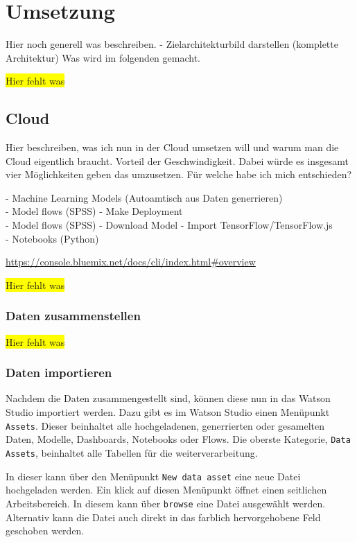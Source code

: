 \section{Umsetzung}
Hier noch generell was beschreiben. - Zielarchitekturbild darstellen (komplette Architektur)
Was wird im folgenden gemacht.

\colorbox{yellow}{Hier fehlt was}

\subsection{Cloud}
Hier beschreiben, was ich nun in der Cloud umsetzen will und warum man die Cloud eigentlich braucht. Vorteil der
Geschwindigkeit. Dabei würde es insgesamt vier Möglichkeiten geben das umzusetzen. Für welche habe ich mich
entschieden?

- Machine Learning Models (Autoamtisch aus Daten generrieren)\\
- Model flows (SPSS) - Make Deployment\\
- Model flows (SPSS) - Download Model - Import TensorFlow/TensorFlow.js\\
- Notebooks (Python)

\url{https://console.bluemix.net/docs/cli/index.html#overview}

\colorbox{yellow}{Hier fehlt was}

\subsubsection{Daten zusammenstellen}
\colorbox{yellow}{Hier fehlt was}

\subsubsection{Daten importieren}
Nachdem die Daten zusammengestellt sind, können diese nun in das Watson Studio importiert werden. Dazu gibt es im Watson
Studio einen Menüpunkt \texttt{Assets}. Dieser beinhaltet alle hochgeladenen, generrierten oder gesamelten Daten, Modelle,
Dashboards, Notebooks oder Flows. Die oberste Kategorie, \texttt{Data Assets}, beinhaltet alle Tabellen für die
weiterverarbeitung.

In dieser kann über den Menüpunkt \texttt{New data asset} eine neue Datei hochgeladen werden. Ein klick auf diesen
Menüpunkt öffnet einen seitlichen Arbeitsbereich. In diesem kann über \texttt{browse} eine Datei ausgewählt werden.
Alternativ kann die Datei auch direkt in das farblich hervorgehobene Feld geschoben werden.

